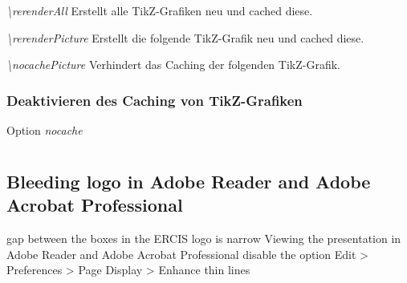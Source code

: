 \documentclass[a4paper,11pt]{article}
\begin{document}

\emph{\textbackslash rerenderAll} Erstellt alle TikZ-Grafiken neu und cached diese.

\emph{\textbackslash rerenderPicture} Erstellt die folgende TikZ-Grafik neu und cached diese.

\emph{\textbackslash nocachePicture} Verhindert das Caching der folgenden TikZ-Grafik.

\providecommand{\rerenderPicture}{%
  \tikzset{external/remake next=true}%
}








\subsubsection*{Deaktivieren des Caching von TikZ-Grafiken}
Option \emph{nocache}

\section{}

\subsection{Bleeding logo in Adobe Reader and Adobe Acrobat Professional}

gap between the boxes in the ERCIS logo is narrow
Viewing the presentation in Adobe Reader and Adobe Acrobat Professional
disable the option Edit > Preferences > Page Display > Enhance thin lines
\end{document}
